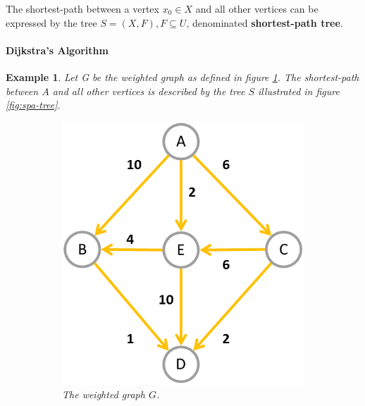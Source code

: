\documentclass[12pt]{report}
\newtheorem{example}{Example}[section]
\begin{document}
The shortest-path between a vertex $x_0 \in X$ and all other vertices can be expressed by the tree $S=(X, F), F \subseteq U$, denominated \textbf{shortest-path tree}.

\paragraph{Dijkstra's Algorithm \cite{cor2011}}

\begin{example}
	Let G be the weighted graph as defined in figure \ref{fig:spa-graph}. The shortest-path between $A$ and all other vertices is described by the tree $S$ illustrated in figure \ref{fig:spa-tree}.

	\begin{figure}[H]
		\centering
		\begin{subfigure}{.4\linewidth}
			\includegraphics[width=\linewidth]{graphs/spa-graph}
			\captionsetup{justification=centering}
			\caption{The weighted graph $G$.}
			\label{fig:spa-graph}
		\end{subfigure}
		\begin{subfigure}{.4\linewidth}

\end{subfigure}
\end{figure}
\end{example}
\end{document}
